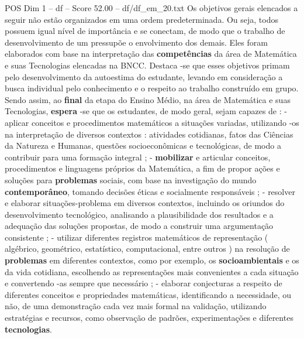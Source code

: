 \begin{textsample}{POS Dim 1 – df – Score 52.00 – df/df\_em\_20.txt}
Os objetivos gerais elencados a seguir não estão organizados em uma ordem predeterminada.
Ou seja, todos possuem igual nível de importância e se conectam, de modo que o trabalho de desenvolvimento de um pressupõe o envolvimento dos demais.
Eles foram elaborados com base na interpretação das \textbf{competências} da área de Matemática e suas Tecnologias elencadas na BNCC.
Destaca -se que esses objetivos primam pelo desenvolvimento da autoestima do estudante, levando em consideração a busca individual pelo conhecimento e o respeito ao trabalho construído em grupo.
Sendo assim, ao \textbf{final} da etapa do Ensino Médio, na área de Matemática e suas Tecnologias, \textbf{espera} -se que os estudantes, de modo geral, sejam capazes de : - aplicar conceitos e procedimentos matemáticos a situações variadas, utilizando -os na interpretação de diversos contextos : atividades cotidianas, fatos das Ciências da Natureza e Humanas, questões socioeconômicas e tecnológicas, de modo a contribuir para uma formação integral ; - \textbf{mobilizar} e articular conceitos, procedimentos e linguagens próprios da Matemática, a fim de propor ações e soluções para \textbf{problemas} sociais, com base na investigação do mundo \textbf{contemporâneo}, tomando decisões éticas e socialmente responsáveis ; - resolver e elaborar situações-problema em diversos contextos, incluindo os oriundos do desenvolvimento tecnológico, analisando a plausibilidade dos resultados e a adequação das soluções propostas, de modo a construir uma argumentação consistente ; - utilizar diferentes registros matemáticos de representação ( algébrico, geométrico, estatístico, computacional, entre outros ) na resolução de \textbf{problemas} em diferentes contextos, como por exemplo, os \textbf{socioambientais} e os da vida cotidiana, escolhendo as representações mais convenientes a cada situação e convertendo -as sempre que necessário ; - elaborar conjecturas a respeito de diferentes conceitos e propriedades matemáticas, identificando a necessidade, ou não, de uma demonstração cada vez mais formal na validação, utilizando estratégias e recursos, como observação de padrões, experimentações e diferentes \textbf{tecnologias}.

\end{textsample}
